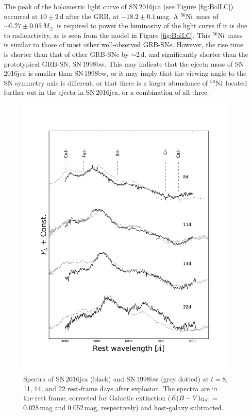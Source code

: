 \documentclass[fleqn,usenatbib]{mnras}
\newcommand{\Msun}{$M_{\odot}$}
\newcommand{\Nifs}{$^{56}$Ni}
\newcommand{\ab}{$\sim$}
\begin{document}
The peak of the bolometric light curve of SN\,2016jca (see Figure \ref{fig:BolLC})
occurred at $10 \pm 2$\,d after the GRB, 
at $-18.2 \pm 0.1$\,mag.  
A \Nifs\ mass of $\sim 0.27 \pm 0.05$\,\Msun\ is required to power the luminosity of the light curve if it is due to radioactivity, as is seen from 
the model in Figure \ref{fig:BolLC}.
 This \Nifs\ mass is similar to those of most other well-observed GRB-SNe.
 However, the rise time is 
shorter than that of other GRB-SNe by \ab2\,d, and significantly shorter than the 
prototypical GRB-SN, SN\,1998bw. 
This may indicate that the ejecta mass of SN\,2016jca is smaller 
than SN\,1998bw,  or it may imply that the viewing
angle to the SN symmetry axis is different, or that there is a 
larger abundance of \Nifs\ located further out in the ejecta in 
SN\,2016jca, or a combination of all three. 

\begin{figure}
 \centering
 \includegraphics[scale=0.3]{plots/comapre98bw.pdf}
 \caption{Spectra of SN\,2016jca (black) and SN\,1998bw (grey dotted)
 \citep{Iwamoto98} at $t = 8$, 11, 14, and 22 rest-frame days after explosion. 
 The spectra are in the rest frame, corrected for Galactic extinction 
 ($E(B-V)_{\rm Gal}$ = 0.028\,mag and 0.052\,mag, respectively) and host-galaxy subtracted.}
 \label{fig:compbw}
\end{figure}
\end{document}
